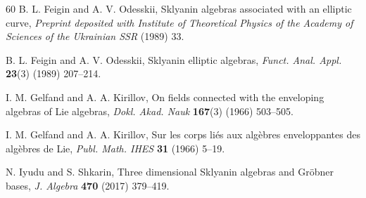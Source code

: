 \documentclass{amsart}
\theoremstyle{definition}
\theoremstyle{remark}
\numberwithin{equation}{section}
\begin{document}
\begin{thebibliography}{60}
 B. L. Feigin and A. V. Odesskii, Sklyanin algebras associated with an elliptic curve, {\em Preprint deposited with Institute of Theoretical Physics of the Academy of Sciences of the Ukrainian SSR} (1989) 33.

 B. L. Feigin and A. V. Odesskii, Sklyanin elliptic algebras, {\em Funct. Anal. Appl.} {\bf 23}(3) (1989) 207--214.


 I. M. Gelfand and A. A. Kirillov, On fields connected with the enveloping algebras of {L}ie algebras, {\em Dokl. Akad. Nauk} {\bf 167}(3) (1966) 503--505.

 I. M. Gelfand and A. A. Kirillov, Sur les corps li\'es aux algèbres enveloppantes des algèbres de Lie, {\em Publ. Math. IHES} {\bf 31} (1966) 5--19.








 N. Iyudu and S. Shkarin, Three dimensional \uppercase{S}klyanin algebras and \uppercase{G}r{\"o}bner bases, {\em J. Algebra} {\bf 470} (2017) 379--419.


\end{thebibliography}
\end{document}

